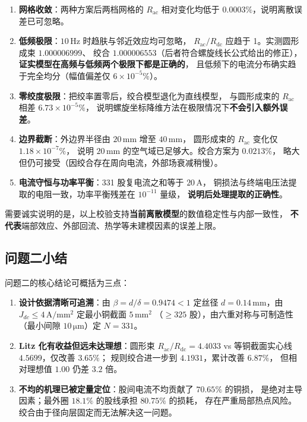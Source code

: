 \documentclass[12pt, a4paper]{ctexart}
\newcommand{\Rac}{R_{\mathrm{ac}}}
\newcommand{\Rdc}{R_{\mathrm{dc}}}
\newcommand{\U}[1]{\ensuremath{\,\mathrm{#1}}}
\begin{document}
\begin{enumerate}[label=(\arabic*), leftmargin=2.2em, itemsep=3pt]
\item \textbf{网格收敛}：两种方案后两档网格的 $\Rac$ 相对变化均低于
$0.0003\%$，说明离散误差已可忽略。
\item \textbf{低频极限}：$10\U{Hz}$ 时趋肤与邻近效应均可忽略，
$\Rac/\Rdc$ 应趋于 1。实测圆形成束 $1.000006999$、
绞合 $1.000006553$（后者符合螺旋线长公式给出的修正），
\textbf{证实模型在高频与低频两个极限下都是正确的}，
且低频下的电流分布确实趋于完全均分（幅值偏差仅 $6\times10^{-5}\%$）。
\item \textbf{零绞度极限}：把绞率置零后，绞合模型退化为直线模型，
与圆形成束的 $\Rac$ 相差 $6.73\times10^{-5}\%$，
说明螺旋坐标降维方法在极限情况下\textbf{不会引入额外误差}。
\item \textbf{边界截断}：外边界半径由 $20\U{mm}$ 增至 $40\U{mm}$，
圆形成束的 $\Rac$ 变化仅 $1.18\times10^{-7}\%$，
说明 $20\U{mm}$ 的空气域已足够大。绞合方案为 $0.0213\%$，
略大但仍可接受（因绞合存在周向电流，外部场衰减稍慢）。
\item \textbf{电流守恒与功率平衡}：331 股复电流之和等于 $20\U{A}$，
铜损法与终端电压法提取的电阻一致，功率平衡残差在 $10^{-11}$ 量级，
\textbf{说明后处理提取的正确性}。
\end{enumerate}

需要诚实说明的是，以上校验支持\textbf{当前离散模型}的数值稳定性与内部一致性，
\textbf{不代表}端部效应、外部回流、热学等未建模因素的误差上限。

\subsection{问题二小结}

问题二的核心结论可概括为三点：

\begin{enumerate}[label=(\arabic*), leftmargin=2.2em, itemsep=3pt]
\item \textbf{设计依据清晰可追溯}：由 $\beta = d/\delta = 0.9474 < 1$ 定丝径
$d = 0.14\U{mm}$，由 $J_{dc}\le 4\U{A/mm^2}$ 定最小铜截面 $5\U{mm^2}$
（$\ge 325$ 股），由六重对称与可制造性（最小间隙 $10\U{\mu m}$）定 $N = 331$。
\item \textbf{Litz 化有收益但远未达理想}：圆形束 $\Rac/\Rdc = 4.4033$
vs 等铜截面实心线 $4.5699$，仅改善 $3.65\%$；
规则绞合进一步到 $4.1931$，累计改善 $6.87\%$，
但相对理想值 $1.00$ 仍差 $3.2$ 倍。
\item \textbf{不均的机理已被定量定位}：股间电流不均贡献了 $70.65\%$ 的铜损，
是绝对主导因素；最外圈 $18.1\%$ 的股线承担 $80.75\%$ 的损耗，
存在严重局部热点风险。绞合由于径向层固定而无法解决这一问题。
\end{enumerate}
\end{document}
